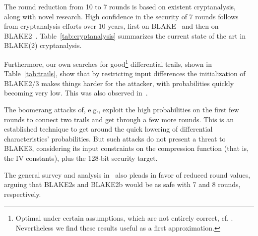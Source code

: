 \documentclass[11pt,notitlepage,a4paper]{article}
\begin{document}
The round reduction from 10 to 7 rounds is based on existent cryptanalysis, along with novel research.
High confidence in the security of 7 rounds follows from cryptanalysis
efforts over 10 years, first on
BLAKE~\cite{DBLP:conf/cans/SuWWD10,DBLP:journals/ipl/VidaliNP10,DBLP:journals/iet-ifs/BaiYWW15,DBLP:conf/fse/AumassonGKMM10,DBLP:journals/iacr/JiL09,DK11,DBLP:conf/fse/BiryukovNR11}
and then on BLAKE2~\cite{DBLP:conf/ctrsa/0001KNWW14,DBLP:conf/cisc/Hao14,DBLP:conf/crypto/EspitauFK15}. Table~\ref{tab:cryptanalysis} summarizes the current state of the art in BLAKE(2) cryptanalysis.

Furthermore, our own searches for good\footnote{Optimal under certain assumptions, which are not entirely correct, cf. \cite{cryptoeprint:2013:328}. Nevertheless we find these results useful as a first approximation.} differential trails, shown in Table~\ref{tab:trails}, show that by restricting input differences the initialization of BLAKE2/3 makes things harder for the attacker, with probabilities quickly becoming very low. This was also observed in~\cite[\S7]{DBLP:conf/ctrsa/0001KNWW14}. 

The boomerang attacks of, e.g.,
\cite{DBLP:conf/cisc/Hao14,DBLP:conf/fse/BiryukovNR11,DBLP:journals/iet-ifs/BaiYWW15}
exploit the high probabilities on the first few rounds to connect two
trails and get through a few more rounds. This is an established
technique to get around the quick lowering of differential
characteristics' probabilities. But such attacks do not present a threat
to BLAKE3, considering its input constraints on the compression function
(that is, the IV constants), plus the $128$-bit security target.

The general survey and analysis in~\cite{TMC} also pleads in favor
of reduced round values, arguing that BLAKE2s and BLAKE2b would be as
safe with 7 and 8 rounds, respectively.
\end{document}
